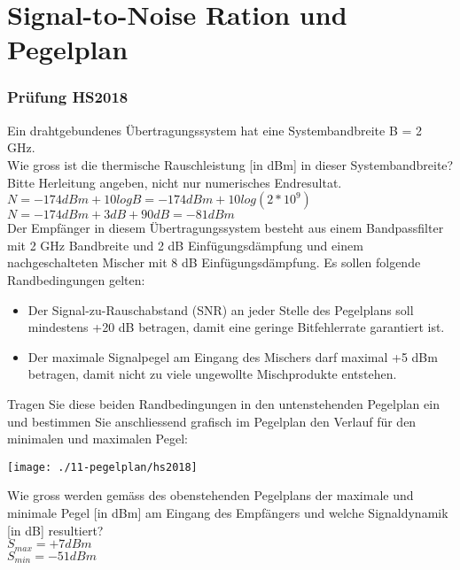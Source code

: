 

\section{Signal-to-Noise Ration und Pegelplan}

\subsubsection{Prüfung HS2018}
Ein drahtgebundenes Übertragungssystem hat eine Systembandbreite B = 2 GHz.\\

Wie gross ist die thermische Rauschleistung [in dBm] in dieser Systembandbreite? Bitte Herleitung angeben, nicht nur numerisches Endresultat.\\
$N=-174dBm+10logB=-174dBm+10log(2*10^9)$\\
$N=-174dBm + 3 dB + 90 dB = -81dBm$\\

Der Empfänger in diesem Übertragungssystem besteht aus einem Bandpassfilter mit 2 GHz Bandbreite und 2 dB Einfügungsdämpfung und einem nachgeschalteten Mischer
mit 8 dB Einfügungsdämpfung. Es sollen folgende Randbedingungen gelten:
\begin{itemize}
    \item Der Signal-zu-Rauschabstand (SNR) an jeder Stelle des Pegelplans soll mindestens +20 dB betragen, damit eine geringe Bitfehlerrate garantiert ist.
    \item Der maximale Signalpegel am Eingang des Mischers darf maximal +5 dBm betragen, damit nicht zu viele ungewollte Mischprodukte entstehen.
\end{itemize}

Tragen Sie diese beiden Randbedingungen in den untenstehenden Pegelplan ein und bestimmen Sie anschliessend grafisch im Pegelplan den Verlauf für den minimalen und
maximalen Pegel:
\begin{center}
    \vspace{-8pt}
    \texttt{[image: ./11-pegelplan/hs2018]}
    \vspace{-8pt}
\end{center}

Wie gross werden gemäss des obenstehenden Pegelplans der maximale und minimale Pegel [in dBm] am Eingang des Empfängers und welche Signaldynamik [in dB] resultiert?\\
$S_{max}=+7dBm$\\
$S_{min}=-51dBm$\\


